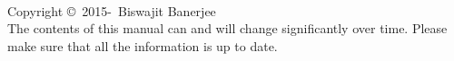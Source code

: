 
  \newpage
  ~\vfill
  \thispagestyle{empty}

  \noindent Copyright \copyright\ 2015-\the\year\, Biswajit Banerjee\\ %




  \noindent The contents of this manual can and will change significantly over time.  Please make sure that all the information is up to date.

  \pagestyle{empty} %
  \tableofcontents %
  \cleardoublepage %
  \pagestyle{fancy} %

  \setlength{\parindent}{0pt}
  \setlength{\parskip}{5pt}


